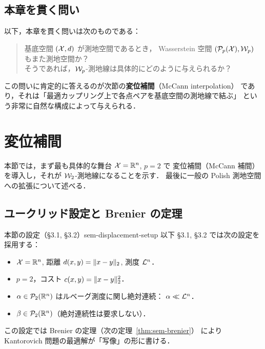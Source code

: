 \subsection{本章を貫く問い}

\begin{memo*}
  以下，本章を貫く問いは次のものである：
  \begin{quote}
    基底空間 $(\mathcal{X}, d)$ が測地空間であるとき，
    Wasserstein 空間 $(\mathcal{P}_p(\mathcal{X}), \mathcal{W}_p)$ もまた測地空間か？\\
    そうであれば，$\mathcal{W}_p$-測地線は具体的にどのように与えられるか？
  \end{quote}
  この問いに肯定的に答えるのが次節の\textbf{変位補間}（McCann interpolation）
  であり，それは「最適カップリング上で各点ペアを基底空間の測地線で結ぶ」
  という非常に自然な構成によって与えられる．
\end{memo*}

\section{変位補間}
\label{sec:sem-displacement}

本節では，まず最も具体的な舞台 $\mathcal{X} = \mathbb{R}^n$, $p = 2$ で
変位補間（McCann 補間）を導入し，それが $\mathcal{W}_2$-測地線になることを示す．
最後に一般の Polish 測地空間への拡張について述べる．

\subsection{ユークリッド設定と Brenier の定理}

\begin{setting}{本節の設定（§3.1, §3.2）}{sem-displacement-setup}
  以下 §3.1, §3.2 では次の設定を採用する：
  \begin{itemize}
    \item $\mathcal{X} = \mathbb{R}^n$, 距離 $d(x, y) = \lVert x - y \rVert_2$, 測度 $\mathcal{L}^n$．
    \item $p = 2$，コスト $c(x, y) = \lVert x - y \rVert_2^2$．
    \item $\alpha \in \mathcal{P}_2(\mathbb{R}^n)$ はルベーグ測度に関し絶対連続：
      $\alpha \ll \mathcal{L}^n$．
    \item $\beta \in \mathcal{P}_2(\mathbb{R}^n)$（絶対連続性は要求しない）．
  \end{itemize}
  この設定では Brenier の定理（次の定理~\ref{thm:sem-brenier}）
  により Kantorovich 問題の最適解が「写像」の形に書ける．
\end{setting}

